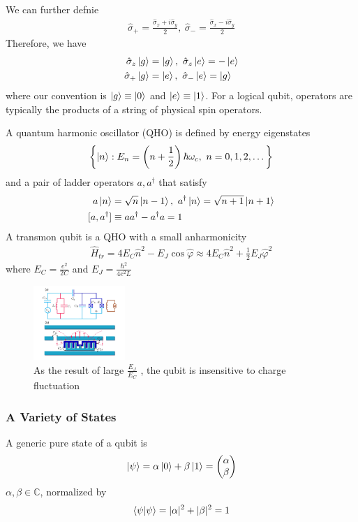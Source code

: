 We can further defnie 
\begin{align*}
    \hat{\sigma}_+=\frac{\hat{\sigma}_x+i\hat{\sigma}_y}{2},\ \hat{\sigma}_-=\frac{\hat{\sigma}_x-i\hat{\sigma}_y}{2}
\end{align*}
Therefore, we have
\begin{align*}
    \hat{\sigma}_z\ket{g}&=\ket{g},\ \hat{\sigma}_z\ket{e}=-\ket{e}\\
    \hat{\sigma}_+\ket{g}&=\ket{e},\ \hat{\sigma}_-\ket{e}=\ket{g}
\end{align*}
where our convention is $\ket{g}\equiv\ket{0}$ and $\ket{e}\equiv\ket{1}$. For a logical qubit, operators are typically the products of a string of physical spin operators. 

A quantum harmonic oscillator (QHO) is defined by energy eigenstates 
\begin{align*}
    \left\{ \ket{n}:E_n=\left( n+\frac{1}{2} \right)\hbar \omega_c,\ n=0,1,2,\dots \right\}
\end{align*} 
and a pair of ladder operators $a, a^\dagger$ that satisfy
\begin{align*}
    a\ket{n}&=\sqrt{n}\ket{n-1},\ a^\dagger\ket{n}=\sqrt{n+1}\ket{n+1}\\
    [a, a^\dagger]&\equiv aa^\dagger-a^\dagger a=1
\end{align*}
A transmon qubit is a QHO with a small anharmonicity
\begin{align*}
    \hat{H}_{tr}=4E_C\hat{n}^2-E_J\cos\hat{\varphi}\approx 4E_C\hat{n}^2+\frac{1}{2}E_J\hat{\varphi}^2
\end{align*}
where $E_C=\frac{e^2}{2C}$ and $E_J=\frac{\hbar^2}{4e^2 L}$

\begin{figure}[!htb]
    \centering
    \includegraphics[width=0.309\textwidth]{pic/Review/the qubit is insensitive to charge fluctuation.png}
    \caption{As the result of large $\frac{E_J}{E_C}$ , the qubit is insensitive to charge fluctuation}
\end{figure}


\subsubsection{A Variety of States}
A generic pure state of a qubit is 
\begin{align*}
    \ket{\psi}=\alpha\ket{0}+\beta\ket{1}=\begin{pmatrix}
        \alpha\\ \beta
    \end{pmatrix}
\end{align*}
$\alpha,\beta\in \mathbb{C}$, normalized by 
\begin{align*}
    \braket{\psi|\psi}=|\alpha|^2+|\beta|^2=1
\end{align*}

